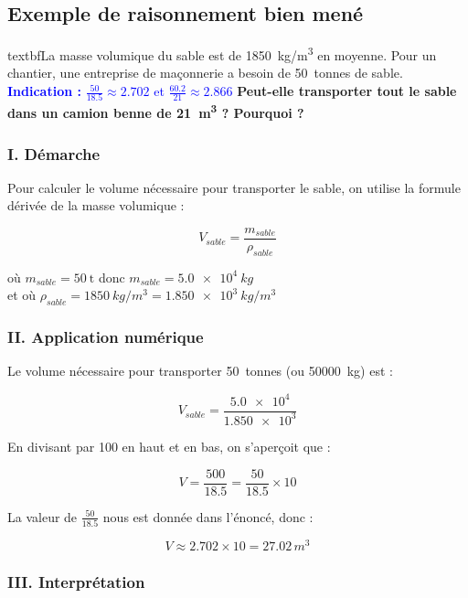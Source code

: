 \documentclass[a4paper,12pt]{article}
\begin{document}
\subsection{Exemple de raisonnement bien mené}

\begin{tcolorbox}[colback=gray!10, colframe=gray!50, title=Notions à maîtriser]

textbf{La masse volumique du sable est de \SI{1850}{kg/m^3} en moyenne. Pour un chantier, une entreprise de maçonnerie a besoin de \SI{50}{tonnes} de sable.}
\textcolor{blue}{\textbf{Indication :} $\frac{50}{18.5} \approx 2.702$ et $\frac{60.2}{21} \approx 2.866$}
\textbf{Peut-elle transporter tout le sable dans un camion benne de \SI{21}{m^3} ? Pourquoi ?}
\end{tcolorbox}

\subsubsection*{I. Démarche}

Pour calculer le volume nécessaire pour transporter le sable, on utilise la formule dérivée de la masse volumique : 

\[
V_{sable} = \frac{m_{sable}}{\rho_{sable}}
\]

où $m_{sable} = \SI{50}{\tonne}$ donc $m_{sable} = \SI{5.0e4}{kg}$ \\
et où $\rho_{sable} = \SI{1850}{kg/m^3} = \SI{1.850e3}{kg/m^3}$

\subsubsection*{II. Application numérique}

Le volume nécessaire pour transporter \SI{50}{tonnes} (ou \SI{50000}{kg}) est :

\[
V_{sable} = \frac{\num{5.0e4}}{\num{1.850e3}}
\]

En divisant par 100 en haut et en bas, on s'aperçoit que :

\[
V = \frac{500}{18.5} = \frac{50}{18.5} \times 10
\]

La valeur de \(\frac{50}{18.5}\) nous est donnée dans l'énoncé, donc :

\[
V \approx 2.702 \times 10 = 27.02\,\si{m^3}
\]

\subsubsection*{III. Interprétation}
\end{document}
